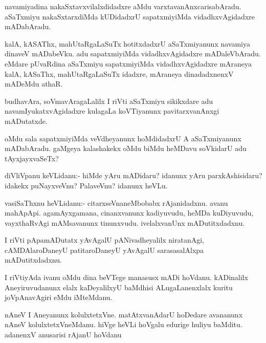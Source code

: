 \begin{mng}
navamiyadina nakaSxtavxvilalxdidadxre aMdu varxtavanAnxcarisabAradu. aSaTxmiyu nakaSxtarxdiMda kUDidadxrU sapatxmiyiMda vidadhxvAgidadxre mADabAradu.
\end{mng}

\begin{mng}
kalA, kASAThx, mahUtaRgaLaSuTx hotitxdadxrU aSaTxmiyanunx navamiya dinaveV mADabeVku. adu sapatxmiyiMda vidadhxvAgidadxre mADaleVbAradu. eMdare pUvaRdina aSaTxmiyu sapatxmiyiMda vidadhxvAgidadxre mAraneya kalA, kASaThx, mahUtaRgaLaSuTx idadxre, mAraneya dinadadxnenxV mADeMdu athaR.
\end{mng}

\begin{mng}
budhavAra, soVmavAragaLalilx I riVti aSaTxmiyu sikikxdare adu navamIyukatxvAgidadxre kulagaLa koVTiyanunx pavitarxvanAnxgi mADutatxde.
\end{mng}

\begin{mng}
oMdu sala sapatxmiyiMda veVdheyanunx hoMdidadxrU A aSaTxmiyanunx mADabAradu. gaMgeya kalashakekx oMdu biMdu heMDavu soVkidarU adu tAyxjayxvaSeTx?
\end{mng}

\begin{mng}
diVliVpanu keVLidanu:- hiMde yAru mADidaru? idanunx yAru parxkAshisidaru? idakekx puNayxveVnu? PalaveVnu? idanunx heVLu.
\end{mng}

\begin{mng}
vasiSaThxnu heVLidanu:- citarxseVnaneMbobabx rAjanidadxnu. avanu mahApApi. agamAyxgamana, cinanxvanunx kadiyuvudu, heMDa kuDiyuvudu, vayxthaRvAgi mAMsavanunx tinunxvudu. ivelalxvanUnx mADutitxdadxnu.
\end{mng}

\begin{mng}
I riVti pApamADutatx yAvAgalU pANivadheyalilx niratanAgi, cAMDAlaroDaneyU patitaroDaneyU yAvAgalU sarasasalAlxpa mADutitxdadxnu.
\end{mng}

\begin{mng}
I riVtiyAda ivanu oMdu dina beVTege manasusx mADi hoVdanu. kADinalilx Aneyiruvudanunx elalx kaDeyalilxyU baMdhisi ALugaLanenxlalx kuritu joVpAnavAgiri eMdu iMteMdanu.
\end{mng}

\begin{mng}
nAneV I Aneyanunx kolulxtetxVne. matAtxvanAdarU hoDedare avananunx nAneV kolulxtetxVneMdanu. hiVge heVLi hoVgalu edurige huliyu baMditu. adanenxV anusarisi rAjanU hoVdanu
\end{mng}

